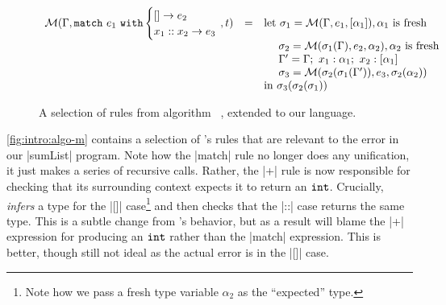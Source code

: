 \begin{figure}
\[{\begin{array}{lcl}
\M(\Gamma, \elcase{e_1}{e_2}{x_1}{x_2}{e_3}\hspace{-2ex}, t)
   & = & \text{let } \sigma_1 = \M(\Gamma, e_1, \tlist{\alpha_1}), \alpha_1 \text{ is fresh} \\
   &   & \quad\ \sigma_2 = \M(\sigma_1(\Gamma), e_2, \alpha_2), \alpha_2 \text{ is fresh} \\
   &   & \quad\ \Gamma' = \Gamma;\ x_1:\alpha_1;\ x_2:\tlist{\alpha_1} \\
   &   & \quad\ \sigma_3 = \M(\sigma_2(\sigma_1(\Gamma')), e_3, \sigma_2(\alpha_2)) \\
   &   & \text{in } \sigma_3(\sigma_2(\sigma_1)) \\
\end{array}
}
\]
\caption{A selection of rules from algorithm \M~\citep{Lee1998-ys},
  extended to our language.}
\label{fig:intro:algo-m}
\end{figure}

\autoref{fig:intro:algo-m} contains a selection of \M's rules that are relevant to the error in our |sumList| program.
%
Note how the |match| rule no longer does any unification, it just makes
a series of recursive calls.
%
Rather, the |+| rule is now responsible for checking that its
surrounding context expects it to return an $\mathtt{int}$.
%
Crucially, \M \emph{infers} a type for the |[]| case\footnote{Note how
  we pass a fresh type variable $\alpha_2$ as the ``expected'' type.}
and then checks that the |::| case returns the same type.
%
This is a subtle change from \W's behavior, but as a result \M will
blame the |+| expression for producing an $\mathtt{int}$ rather than the
|match| expression.
%
This is better, though still not ideal as the actual error is in the
|[]| case.

%

